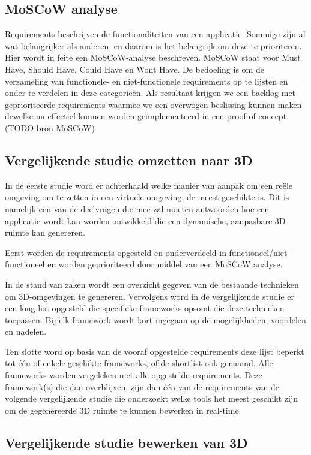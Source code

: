 \subsection{MoSCoW analyse}

Requirements beschrijven de functionaliteiten van een applicatie. Sommige zijn al wat belangrijker als anderen, en daarom is het belangrijk om deze te prioriteren.
Hier wordt in feite een MoSCoW-analyse beschreven. MoSCoW staat voor Must Have, Should Have, Could Have en Wont Have. De bedoeling is om de verzameling van functionele- en niet-functionele requirements op te lijsten en onder te verdelen in deze categorieën. Als resultaat krijgen we een backlog met geprioriteerde requirements waarmee we een overwogen beslissing kunnen maken dewelke nu effectief kunnen worden geïmplementeerd in een proof-of-concept. (TODO bron MoSCoW)

\subsection{Vergelijkende studie omzetten naar 3D }

In de eerste studie word er achterhaald welke manier van aanpak om een reële omgeving om te zetten in een virtuele omgeving, de meest geschikte is. Dit is namelijk een van de deelvragen die mee zal moeten antwoorden hoe een applicatie wordt kan worden ontwikkeld die een dynamische, aanpasbare 3D ruimte kan genereren.

Eerst worden de requirements opgesteld en onderverdeeld in functioneel/niet-functioneel en worden geprioriteerd door middel van een MoSCoW analyse.

In de stand van zaken wordt een overzicht gegeven van de bestaande technieken om 3D-omgevingen te genereren. Vervolgens word in de vergelijkende studie er een long list opgesteld die specifieke frameworks opsomt die deze technieken toepassen. Bij elk framework wordt kort ingegaan op de mogelijkheden, voordelen en nadelen.

Ten slotte word op basis van de vooraf opgestelde requirements deze lijst beperkt tot één of enkele geschikte frameworks, of de shortlist ook genaamd. Alle frameworks worden vergeleken met alle opgestelde requirements. Deze framework(s) die dan overblijven, zijn dan één van de requirements van de volgende vergelijkende studie die onderzoekt welke tools het meest geschikt zijn om de gegenereerde 3D ruimte te kunnen bewerken in real-time.


\subsection{Vergelijkende studie bewerken van 3D }

